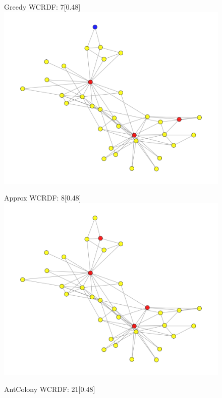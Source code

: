 \begin{figure}[htbp]
\begin{subcaptionbox}{Greedy  WCRDF: 7\label{fig:greedy}}[0.48\linewidth]
        {\includegraphics[width=\linewidth]{assets/Facebook/greedy.png}}
    \end{subcaptionbox}
    \hfill
    \begin{subcaptionbox}{Approx  WCRDF: 8\label{fig:approx}}[0.48\linewidth]
        {\includegraphics[width=\linewidth]{assets/Facebook/approx.png}}
    \end{subcaptionbox}
    \hfill
    \begin{subcaptionbox}{AntColony  WCRDF: 21\label{fig:ant}}[0.48\linewidth]

\end{subcaptionbox}
\end{figure}
